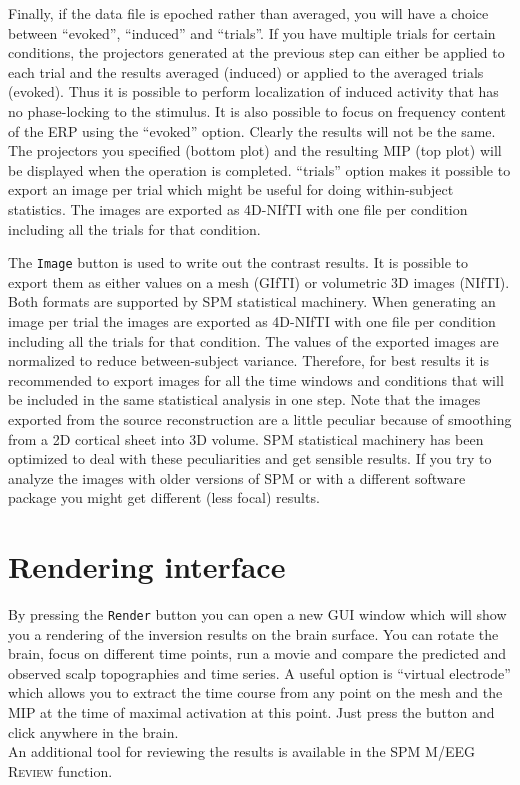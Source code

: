 Finally, if the data file is epoched rather than averaged, you will have a choice between ``evoked'', ``induced'' and ``trials''. If you have multiple trials for certain conditions, the projectors generated at the previous step can either be applied to each trial and the results averaged (induced) or applied to the averaged trials (evoked). Thus it is possible to perform localization of induced activity that has no phase-locking to the stimulus. It is also possible to focus on frequency content of the ERP using the ``evoked'' option. Clearly the results will not be the same. The projectors you specified (bottom plot) and the resulting MIP (top plot) will be displayed when the operation is completed. ``trials'' option makes it possible to export an image per trial which might be useful for doing within-subject statistics. The images are exported as 4D-NIfTI with one file per condition including all the trials for that condition.

The \texttt{Image} button is used to write out the contrast results. It is possible to export them as either values on a mesh (GIfTI) or volumetric 3D images (NIfTI). Both formats are supported by SPM statistical machinery. When generating an image per trial the images are exported as 4D-NIfTI with one file per condition including all the trials for that condition. The values of the exported images are normalized to reduce between-subject variance. Therefore, for best results it is recommended to export images for all the time windows and conditions that will be included in the same statistical analysis in one step. Note that the images exported from the source reconstruction are a little peculiar because of smoothing from a 2D cortical sheet into 3D volume. SPM statistical machinery has been optimized to deal with these peculiarities and get sensible results. If you try to analyze the images with older versions of SPM or with a different software package you might get different (less focal) results.

\section{Rendering interface}
By pressing the \texttt{Render} button you can open a new GUI window which will show you a rendering of the inversion results on the brain surface. You can rotate the brain, focus on different time points, run a movie and compare the predicted and observed scalp topographies and time series. A useful option is ``virtual electrode'' which allows you to extract the time course from any point on the mesh and the MIP at the time of maximal activation at this point. Just press the button and click anywhere in the brain.\\
An additional tool for reviewing the results is available in the SPM M/EEG \textsc{Review} function.

